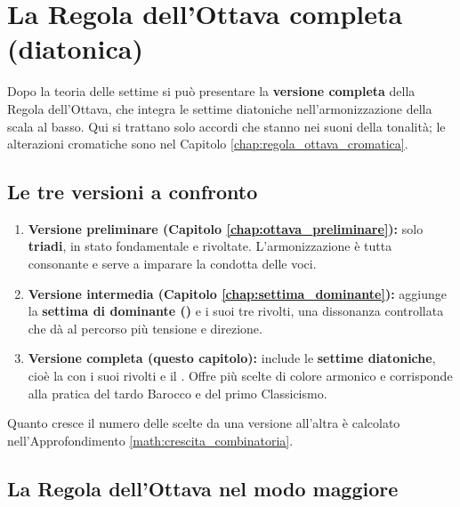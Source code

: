 \chapter{La Regola dell'Ottava completa (diatonica)}
\label{chap:regola_ottava_completa}

Dopo la teoria delle settime si può presentare la \textbf{versione completa} della Regola dell'Ottava, che integra le settime diatoniche nell'armonizzazione della scala al basso. Qui si trattano solo accordi che stanno nei suoni della tonalità; le alterazioni cromatiche sono nel Capitolo \ref{chap:regola_ottava_cromatica}.

\section{Le tre versioni a confronto}
\label{sec:tre_versioni_confronto}

\begin{definizione}
	\label{def:tre_versioni_complete}
	\begin{enumerate}
		\item \textbf{Versione preliminare (Capitolo \ref{chap:ottava_preliminare}):} solo \textbf{triadi}, in stato fondamentale e rivoltate. L'armonizzazione è tutta consonante e serve a imparare la condotta delle voci.
		\item \textbf{Versione intermedia (Capitolo \ref{chap:settima_dominante}):} aggiunge la \textbf{settima di dominante ()} e i suoi tre rivolti, una dissonanza controllata che dà al percorso più tensione e direzione.
		\item \textbf{Versione completa (questo capitolo):} include le \textbf{settime diatoniche}, cioè la  con i suoi rivolti e il . Offre più scelte di colore armonico e corrisponde alla pratica del tardo Barocco e del primo Classicismo.
	\end{enumerate}
\end{definizione}

Quanto cresce il numero delle scelte da una versione all'altra è calcolato nell'Approfondimento \ref{math:crescita_combinatoria}.

\section{La Regola dell'Ottava nel modo maggiore}
\label{sec:regola_completa_maggiore}


